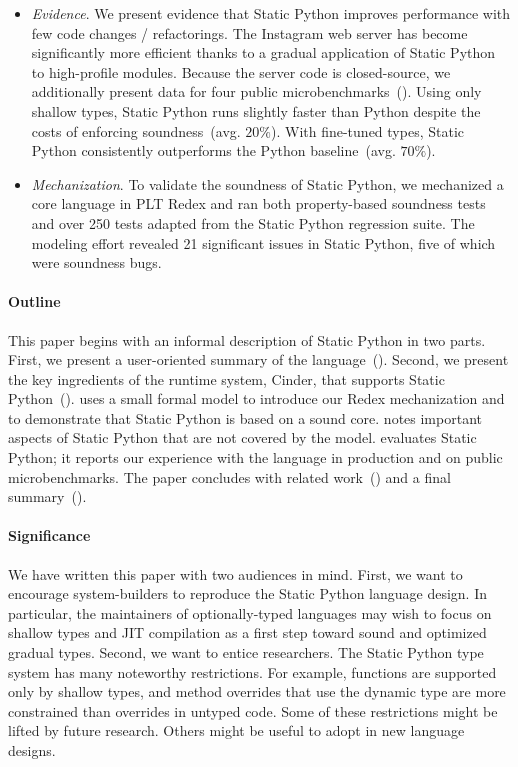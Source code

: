 \documentclass[english,cleveref,crc]{programming}
\newcommand{\SP}{Static Python}
\newcommand{\pctnum}[1]{$#1\%$}
\begin{document}
\begin{itemize}
  \item
    \emph{Evidence}.
    We present evidence that \SP{} improves performance with few code changes
    / refactorings.
    The Instagram web server has become significantly more efficient
    thanks to a gradual application of \SP{} to high-profile modules.
    Because the server code is closed-source, we additionally present data for
    four public microbenchmarks~().
    Using only shallow types, \SP{} runs slightly faster than Python
    despite the costs of enforcing soundness~(avg. \pctnum{20}).
    With fine-tuned types, \SP{} consistently outperforms the Python
    baseline~(avg. \pctnum{70}).

  \item
    \emph{Mechanization}.
    To validate the soundness of \SP{}, we mechanized a core language in PLT Redex
    and ran both property-based soundness tests and over 250 tests adapted from the \SP{} regression suite.
    The modeling effort revealed 21 significant issues in \SP{},
    five of which were soundness bugs.

\end{itemize}

\paragraph*{Outline}

This paper begins with an informal description of \SP{} in two parts.
First, we present a user-oriented summary of the language~().
Second, we present the key ingredients of the runtime system, Cinder,
that supports \SP{}~().
 uses a small formal model to introduce our Redex mechanization
and to demonstrate that \SP{} is based on a sound core.
 notes important aspects of \SP{} that are not covered by the model.
 evaluates \SP{}; it reports our experience with the language in
production and on public microbenchmarks.
The paper concludes with related work~()
and a final summary~().


\paragraph*{Significance}

We have written this paper with two audiences in mind.
First, we want to encourage system-builders to reproduce the
\SP{} language design.
In particular, the maintainers of optionally-typed languages
may wish to focus on shallow types and JIT compilation as a
first step toward sound and optimized gradual types.
Second, we want to entice researchers.
The \SP{} type system has many noteworthy restrictions.
For example, functions are supported only by shallow types,
and method overrides that use the dynamic type are more constrained
than overrides in untyped code.
Some of these restrictions might be lifted by future research.
Others might be useful to adopt in new language designs.
\end{document}
